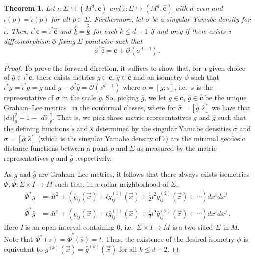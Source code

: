 \documentclass[a4paper,10.9pt]{amsart}
\newtheorem{theorem}{Theorem}[section]
\theoremstyle{definition}
\theoremstyle{remark}
\numberwithin{equation}{section}
\newcommand{\cc}{\boldsymbol{c}}
\renewcommand{\=}{\stackrel \Sigma =}
\renewcommand\leq{\leqslant}
\newcommand{\FFo}[1]{\mathring{\underline{\overline{\rm{#1}}}}}
\begin{document}
\begin{theorem} \label{conformal-identification}
Let $\iota : \Sigma \hookrightarrow (M^d,\cc)$ and $\hat{\iota} : \Sigma \hookrightarrow (M^d,\hat{\cc})$ with $d$ even and $\iota(p) = \hat{\iota}(p)$ for all $p \in \Sigma$. Furthermore, let $\sigma$ be a singular Yamabe density for $\iota$. Then, $\iota^* \cc = \hat{\iota}^* \hat{\cc}$ and $\FFo{k} = \hat{\FFo{k}}$ for each $k \leq d-1$ if and only if  there exists a diffeomorphism $\phi$ fixing $\Sigma$ pointwise such that
$$\phi^* \hat{\cc} = \cc + \mathcal{O}(\sigma^{d-1})\,.$$
\end{theorem}
\begin{proof}
To prove the forward direction, it suffices to show that, for a given choice of $\bar{g} \in \iota^* \cc$, there exists metrics $g \in \cc$, $\hat{g} \in \hat{\cc}$ and an isometry $\phi$ such that $\iota^* g = \hat{\iota}^* \hat{g} = \bar{g}$ and $g - \phi^* \hat{g} = \mathcal{O}(s^{d-1})$ where $\sigma = [g;s]$, i.e.\ $s$ is the representative of $\sigma$ in the scale $g$. 
So, picking $\bar{g}$, we let $g \in \cc$, $\hat{g} \in \hat{\cc}$ be the unique Graham--Lee metrics~\cite{GrahamLee} in the conformal classes, where for $\hat{\sigma} = [\hat{g}, \hat{s}]$ we have that $|ds|_g^2 = 1 =|d\hat{s}|_{\hat{g}}^2$. That is, we pick those metric representatives $g$ and $\hat{g}$ such that the defining functions $s$ and $\hat{s}$ determined by the singular Yamabe densities $\sigma$ and $\hat{\sigma} = [\hat{g}; \hat{s}]$ (which is the singular Yamabe density of $\hat{\iota}$) are the minimal geodesic distance functions between a point $p$ and $\Sigma$ as measured by the metric representatives $g$ and $\hat{g}$ respectively.

As $g$ and $\hat{g}$ are Graham--Lee metrics, it follows that there always exists isometries 
$\Phi,\hat{\Phi} : \Sigma \times I \rightarrow M$ such that, in a collar neighborhood of $\Sigma$,
\begin{align*}
\Phi^* g &= dt^2 + (\bar{g}_{ij}(\vec{x}) + t g^{(1)}_{ij}(\vec{x}) + \tfrac{1}{2} t^2 g^{(2)}_{ij}(\vec{x}) + \cdots) dx^i dx^j  \\
\hat{\Phi}^* \hat{g} &= dt^2 + (\bar{g}_{ij}(\vec{x}) + t \hat{g}^{(1)}_{ij}(\vec{x}) + \tfrac{1}{2} t^2 \hat{g}^{(2)}_{ij}(\vec{x}) + \cdots) dx^i dx^j \,.
\end{align*}
Here $I$ is an open interval containing $0$, i.e.\ $ \Sigma \times I \rightarrow M$ is a two-sided $\Sigma$ in $M$.
Note that $\Phi^*(s) = \hat{\Phi}^*(\hat{s}) = t$. Thus, the existence of the desired isometry $\phi$ is equivalent to $g^{(k)}(\vec{x}) = \hat{g}^{(k)}(\vec{x})$ for all $k \leq d-2$.


\end{proof}
\end{document}
